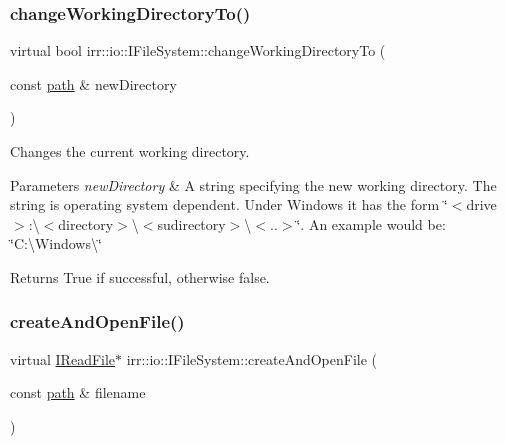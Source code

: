 \subsubsection{\texorpdfstring{change\+Working\+Directory\+To()}{changeWorkingDirectoryTo()}\hspace{0.1cm}{\footnotesize\ttfamily [2/2]}}
{\footnotesize\ttfamily virtual bool irr\+::io\+::\+I\+File\+System\+::change\+Working\+Directory\+To (\begin{DoxyParamCaption}\item[{const \hyperlink{namespaceirr_1_1io_a6468281622ce3a1c46b72e19f32dded5}{path} \&}]{new\+Directory }\end{DoxyParamCaption})\hspace{0.3cm}{\ttfamily [pure virtual]}}



Changes the current working directory. 


\begin{DoxyParams}{Parameters}
{\em new\+Directory} & A string specifying the new working directory. The string is operating system dependent. Under Windows it has the form \char`\"{}$<$drive$>$\+:\textbackslash{}$<$directory$>$\textbackslash{}$<$sudirectory$>$\textbackslash{}$<$..$>$\char`\"{}. An example would be\+: \char`\"{}\+C\+:\textbackslash{}\+Windows\textbackslash{}\char`\"{} \\
\hline
\end{DoxyParams}
\begin{DoxyReturn}{Returns}
True if successful, otherwise false. 
\end{DoxyReturn}
\mbox{\label{classirr_1_1io_1_1IFileSystem_a3678bb77e12cc6ee2b3947f4c79f6c90}} 
\subsubsection{\texorpdfstring{create\+And\+Open\+File()}{createAndOpenFile()}\hspace{0.1cm}{\footnotesize\ttfamily [1/2]}}
{\footnotesize\ttfamily virtual \hyperlink{classirr_1_1io_1_1IReadFile}{I\+Read\+File}$\ast$ irr\+::io\+::\+I\+File\+System\+::create\+And\+Open\+File (\begin{DoxyParamCaption}\item[{const \hyperlink{namespaceirr_1_1io_a6468281622ce3a1c46b72e19f32dded5}{path} \&}]{filename }\end{DoxyParamCaption})\hspace{0.3cm}{\ttfamily [pure virtual]}}



